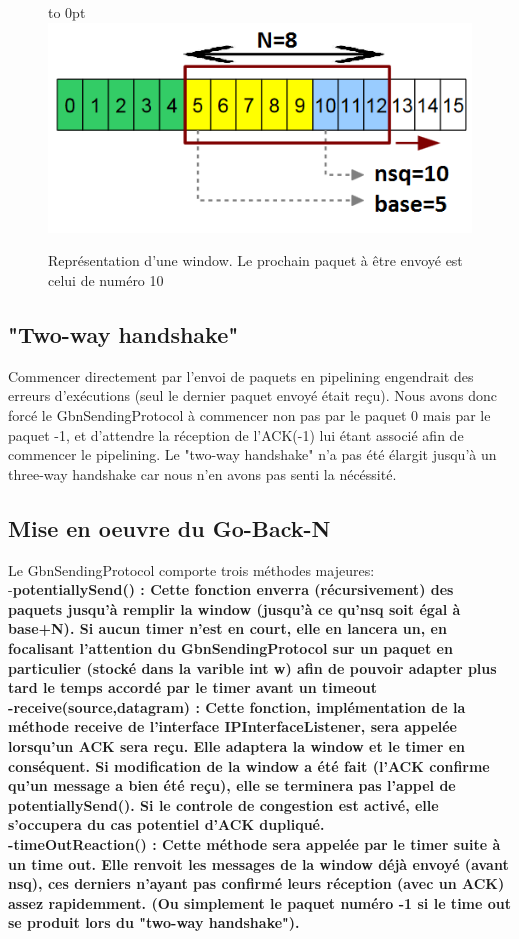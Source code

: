 \documentclass[11pt]{article}
\begin{document}
\begin{figure}[h]
  \hfill\hbox to 0pt{\hss\includegraphics[scale=0.75]{window.png}\hss}\hfill\null
  \caption{Représentation d'une window. Le prochain paquet à être envoyé est celui de numéro 10}
\end{figure}

\subsection{"Two-way handshake"}
Commencer directement par l'envoi de paquets en pipelining engendrait des erreurs d'exécutions (seul le dernier paquet envoyé était reçu). Nous avons donc forcé le GbnSendingProtocol à commencer non pas par le paquet 0 mais par le paquet -1, et d'attendre la réception de l'ACK(-1) lui étant associé afin de commencer le pipelining. Le "two-way handshake" n'a pas été élargit jusqu'à un three-way handshake car nous n'en avons pas senti la nécéssité.

\subsection{Mise en oeuvre du Go-Back-N}
Le GbnSendingProtocol comporte trois méthodes majeures: \\
-\bfseries potentiallySend() \mdseries : Cette fonction enverra (récursivement) des paquets jusqu'à remplir la window (jusqu'à ce qu'nsq soit égal à base+N). Si aucun timer n'est en court, elle en lancera un, en focalisant l'attention du GbnSendingProtocol sur un paquet en particulier (stocké dans la varible int w) afin de pouvoir adapter plus tard le temps accordé par le timer avant un timeout \\
-\bfseries receive(source,datagram) \mdseries : Cette fonction, implémentation de la méthode receive de l'interface IPInterfaceListener, sera appelée lorsqu'un ACK sera reçu. Elle adaptera la window et le timer en conséquent. Si modification de la window a été fait (l'ACK confirme qu'un message a bien été reçu), elle se terminera pas l'appel de potentiallySend(). Si le controle de congestion est activé, elle s'occupera du cas potentiel d'ACK dupliqué. \\
-\bfseries timeOutReaction() \mdseries : Cette méthode sera appelée par le timer suite à un time out. Elle renvoit les messages de la window déjà envoyé (avant nsq), ces derniers n'ayant pas confirmé leurs réception (avec un ACK) assez rapidemment. (Ou simplement le paquet numéro -1 si le time out se produit lors du "two-way handshake").\\
\end{document}
